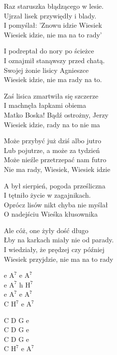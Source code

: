 \begin{text}
Raz staruszka błądzącego w lesie.\\
Ujrzał lisek przywiędły i blady.\\
I pomyślał: 'Znowu idzie Wiesiek\\
Wiesiek idzie, nie ma na to rady'

I podreptał do nory po ścieżce\\
I oznajmił stanąwszy przed chatą.\\
Swojej żonie lisicy Agnieszce\\
Wiesiek idzie, nie ma rady na to.

Zaś lisica zmartwiła się szczerze\\
I machnęła łapkami obiema\\
Matko Boska! Bądź ostrożny, Jerzy\\
Wiesiek idzie, rady na to nie ma

Może przybyć już dziś albo jutro\\
Lub pojutrze, a może za tydzień\\
Może nieźle przetrzepać nam futro\\
Nie ma rady, Wiesiek, Wiesiek idzie

A był sierpień, pogoda prześliczna\\
I tętniło życie w zagajnikach.\\
Oprócz lisów nikt chyba nie myślał\\
O nadejściu Wieśka kłusownika

Ale cóż, one żyły dość długo\\
Łby na karkach miały nie od parady.\\
I wiedziały, że prędzej czy później\\
Wiesiek przyjdzie, nie ma na to rady
\end{text}
\begin{chord}
e $\mathrm{A^7}$ e $\mathrm{A^7}$\\
e $\mathrm{A^7}$ h $\mathrm{H^7}$\\
e $\mathrm{A^7}$ e $\mathrm{A^7}$\\
C $\mathrm{H^7}$ e $\mathrm{A^7}$

C D G e\\
C D G e\\
C D G e\\
C $\mathrm{H^7}$ e $\mathrm{A^7}$
\end{chord}
